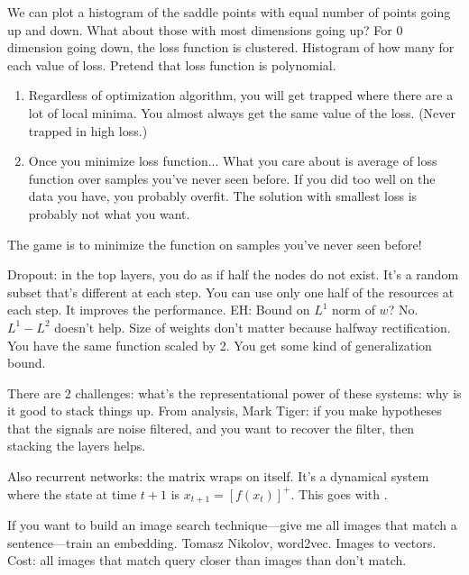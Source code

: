 We can plot a histogram of the saddle points with equal number of points going up and down. What about those with most dimensions going up? For 0 dimension going down, the loss function is clustered. 
Histogram of how many for each value of loss. Pretend that loss function is polynomial.
\begin{enumerate}
\item
Regardless of optimization algorithm, you will get trapped where there are a lot of local minima. You almost always get the same value of the loss. (Never trapped in high loss.)
\item
Once you minimize loss function...
What you care about is average of loss function over %
samples you've never seen before. If you did too well on the data you have, you probably overfit. The solution with smallest loss is probably not what you want.
\end{enumerate}
The game is to minimize the function on samples you've never seen before!

Dropout: in the top layers, you do as if half the nodes do not exist. It's a random subset that's different at each step. You can use only one half of the resources at each step.
It improves the performance.
EH: Bound on $L^1$ norm of $w$? No.
$L^1-L^2$ doesn't help. Size of weights don't matter because halfway rectification. You have the same function scaled by 2. You get some kind of generalization bound.

There are 2 challenges: what's the representational power of these systems: why is it good to stack things up. From analysis, Mark Tiger: if you make hypotheses that the signals are noise filtered, and you want to recover the filter, then stacking the layers helps.

Also recurrent networks: the matrix wraps on itself. It's a dynamical system where the state at time $t+1$ is $x_{t+1}=[f(x_t)]^+$. This goes with .


If you want to build an image search technique---give me all images that match a sentence---train an embedding. Tomasz Nikolov, word2vec. Images to vectors. Cost: all images that match query closer than images than don't match.

